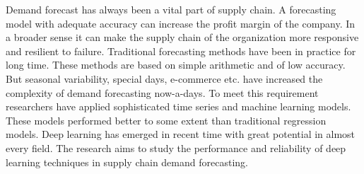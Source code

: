 Demand forecast has always been a vital part of supply chain. A forecasting model with adequate accuracy can increase the profit margin of the company. In a broader sense it can make the supply chain of the organization more responsive and resilient to failure. Traditional forecasting methods have been in practice for long time. These methods are based on simple arithmetic and of low accuracy. But seasonal variability, special days, e-commerce etc. have increased  the complexity of demand forecasting now-a-days. To meet this requirement researchers have applied sophisticated time series and machine learning models. These models performed better to some extent than traditional regression models. Deep learning has emerged in recent time with great potential in almost every field. The research aims to study the performance and reliability of deep learning techniques in supply chain demand forecasting.    